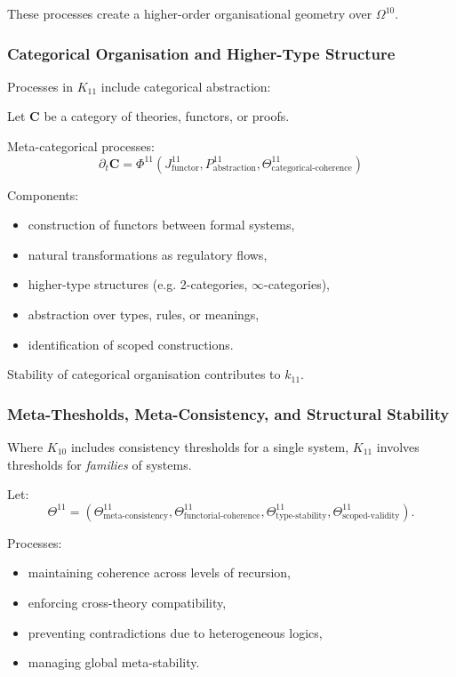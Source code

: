 These processes create a higher-order organisational geometry over $\Omega^{10}$.

\subsubsection{Categorical Organisation and Higher-Type Structure}

Processes in $K_{11}$ include categorical abstraction:

Let $\mathbf{C}$ be a category of theories, functors, or proofs.

Meta-categorical processes:
\[
\partial_t \mathbf{C} =
\Phi^{11}(J^{11}_{\text{functor}},
          P^{11}_{\text{abstraction}},
          \Theta^{11}_{\text{categorical-coherence}})
\]

Components:
\begin{itemize}
    \item construction of functors between formal systems,
    \item natural transformations as regulatory flows,
    \item higher-type structures (e.g. 2-categories, $\infty$-categories),
    \item abstraction over types, rules, or meanings,
    \item identification of scoped constructions.
\end{itemize}

Stability of categorical organisation contributes to $k_{11}$.

\subsubsection{Meta-Thesholds, Meta-Consistency, and Structural Stability}

Where $K_{10}$ includes consistency thresholds for a single system,
$K_{11}$ involves thresholds for \emph{families} of systems.

Let:
\[
\Theta^{11} =
(\Theta^{11}_{\text{meta-consistency}},
 \Theta^{11}_{\text{functorial-coherence}},
 \Theta^{11}_{\text{type-stability}},
 \Theta^{11}_{\text{scoped-validity}}).
\]

Processes:
\begin{itemize}
    \item maintaining coherence across levels of recursion,
    \item enforcing cross-theory compatibility,
    \item preventing contradictions due to heterogeneous logics,
    \item managing global meta-stability.
\end{itemize}

